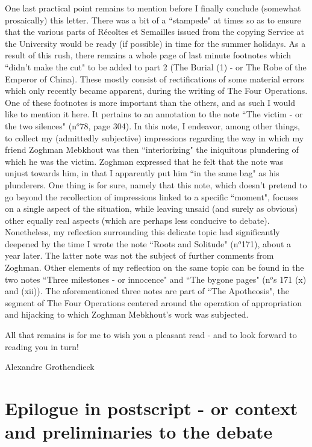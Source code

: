 One last practical point remains to mention before I finally conclude (somewhat prosaically) this letter. There was a bit of a ``stampede" at times so as to ensure that the various parts of R\'ecoltes et Semailles issued from the copying Service at the University would be ready (if possible) in time for the summer holidays. As a result of this rush, there remains a whole page of last minute footnotes which ``didn't make the cut" to be added to part 2 (The Burial (1) - or The Robe of the Emperor of China). These mostly consist of rectifications of some material errors which only recently became apparent, during the writing of The Four Operations. One of these footnotes is more important than the others, and as such I would like to mention it here. It pertains to an annotation to the note ``The victim - or the two silences" (n$^o$78, page 304). In this note, I endeavor, among other things, to collect my (admittedly subjective) impressions regarding the way in which my friend Zoghman Mebkhout was then ``interiorizing" the iniquitous plundering of which he was the victim. Zoghman expressed that he felt that the note was unjust towards him, in that I apparently put him ``in the same bag" as his plunderers. One thing is for sure, namely that this note, which doesn't pretend to go beyond the recollection of impressions linked to a specific ``moment", focuses on a single aspect of the situation, while leaving unsaid (and surely as obvious) other equally real aspects (which are perhaps less conducive to debate). Nonetheless, my reflection surrounding this delicate topic had significantly deepened by the time I wrote the note ``Roots and Solitude" (n$^o$171), about a year later. The latter note was not the subject of further comments from Zoghman. Other elements of my reflection on the same topic can be found in the two notes ``Three milestones - or innocence" and ``The bygone pages" (n$^o$s 171 (x) and (xii)). The aforementioned three notes are part of ``The Apotheosis", the segment of The Four Operations centered around the operation of appropriation and hijacking to which Zoghman Mebkhout's work was subjected.

All that remains is for me to wish you a pleasant read - and to look forward to reading you in turn!

\begin{flushright}
Alexandre Grothendieck
\end{flushright}

\section*{Epilogue in postscript - or context and preliminaries to the debate}


